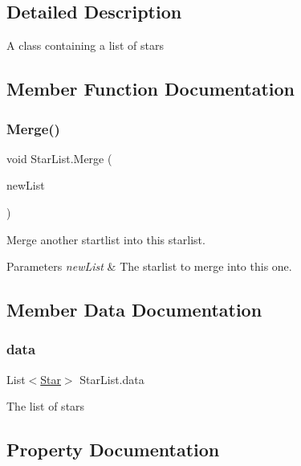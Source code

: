 \subsection{Detailed Description}
A class containing a list of stars 



\subsection{Member Function Documentation}
\mbox{\label{class_star_list_a7c9063960137e10d9e3cf15deff1bf93}} 
\subsubsection{\texorpdfstring{Merge()}{Merge()}}
{\footnotesize\ttfamily void Star\+List.\+Merge (\begin{DoxyParamCaption}\item[{\mbox{\hyperlink{class_star_list}{Star\+List}}}]{new\+List }\end{DoxyParamCaption})}



Merge another startlist into this starlist. 


\begin{DoxyParams}{Parameters}
{\em new\+List} & The starlist to merge into this one.\\
\hline
\end{DoxyParams}


\subsection{Member Data Documentation}
\mbox{\label{class_star_list_a90e9208e7ae266d049ff3868ba9d3784}} 
\subsubsection{\texorpdfstring{data}{data}}
{\footnotesize\ttfamily List$<$\mbox{\hyperlink{struct_star}{Star}}$>$ Star\+List.\+data}



The list of stars 



\subsection{Property Documentation}
\mbox{\label{class_star_list_a7a0efcbd12035c8047769241830f6c63}} 
